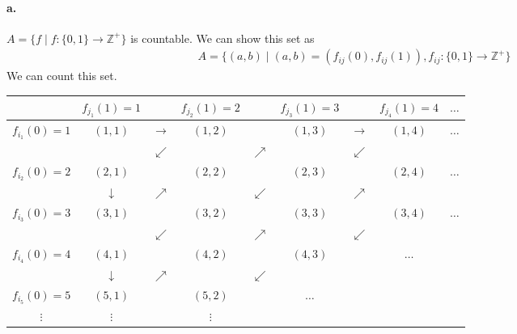 \documentclass[11pt]{article}
\begin{document}
\paragraph{a.} $A = \{f \mid f: \{0, 1\} \rightarrow \mathbb{Z}^+\}$ is countable. We can show this set as
\begin{align*}
    A = \{(a, b) \mid (a, b) = (f_{ij}(0), f_{ij}(1)), f_{ij}: \{0, 1\} \rightarrow \mathbb{Z}^+\}
\end{align*}
We can count this set. \\
\begin{center}
\begin{tabular}{c c c c c c c c c}
                     & $f_{j_1}(1) = 1$ &       & $f_{j_2}(1) = 2$ &  & $f_{j_3}(1) = 3$ &       & $f_{j_4}(1) = 4$ & $\dots$ \\ \hline
    $f_{i_1}(0) = 1$ & $(1, 1)$ & $\rightarrow$ & $(1, 2)$ &          & $(1, 3)$ & $\rightarrow$ & $(1, 4)$ & $\dots$ \\
                     &          & $\swarrow$    &          & $\nearrow$ &        & $\swarrow$    & \\
    $f_{i_2}(0) = 2$ & $(2, 1)$ &               & $(2, 2)$ &          & $(2, 3)$ &               & $(2, 4)$ & $\dots$ \\
                     & $\downarrow$ & $\nearrow$ &         & $\swarrow$ &        & $\nearrow$    & \\
    $f_{i_3}(0) = 3$ & $(3, 1)$ &               & $(3, 2)$ &          & $(3, 3)$ &               & $(3, 4)$ & $\dots$ \\
                     &          & $\swarrow$    &          & $\nearrow$ &        & $\swarrow$    & \\
    $f_{i_4}(0) = 4$ & $(4, 1)$ &               & $(4, 2)$ &          & $(4, 3)$ &               & $\dots$ \\
                     & $\downarrow$ & $\nearrow$ &         & $\swarrow$ &        & \\
    $f_{i_5}(0) = 5$ & $(5, 1)$ &               & $(5, 2)$ &          & $\dots$ \\
    $\vdots$         & $\vdots$ &               & $\vdots$ \\
    
\end{tabular}
\end{center}
\end{document}
